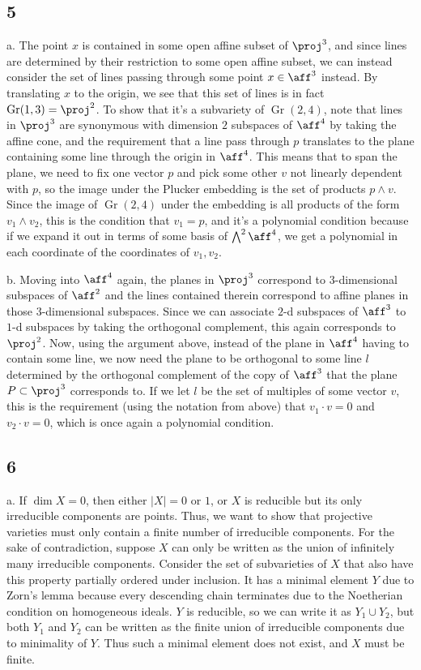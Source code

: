 \documentclass{article}
\DeclareMathOperator{\Gr}{Gr}
\begin{document}
\subsection*{5}
a. The point $x$ is contained in some open affine subset of $\proj^3$, and since lines are determined by their restriction to some open affine subset, we can instead consider the set of lines passing through some point $x\in\aff^3$ instead. By translating $x$ to the origin, we see that this set of lines is in fact $\Gr(1,3)=\proj^2$. To show that it's a subvariety of $\Gr(2,4)$, note that lines in $\proj^3$ are synonymous with dimension $2$ subspaces of $\aff^4$ by taking the affine cone, and the requirement that a line pass through $p$ translates to the plane containing some line through the origin in $\aff^4$. This means that to span the plane, we need to fix one vector $p$ and pick some other $v$ not linearly dependent with $p$, so the image under the Plucker embedding is the set of products $p\wedge v$. Since the image of $\Gr(2,4)$ under the embedding is all products of the form $v_1\wedge v_2$, this is the condition that $v_1=p$, and it's a polynomial condition because if we expand it out in terms of some basis of $\bigwedge^2 \aff^4$, we get a polynomial in each coordinate of the coordinates of $v_1,v_2$.

b. Moving into $\aff^4$ again, the planes in $\proj^3$ correspond to $3$-dimensional subspaces of $\aff^2$ and the lines contained therein correspond to affine planes in those $3$-dimensional subspaces. Since we can associate $2$-d subspaces of $\aff^3$ to $1$-d subspaces by taking the orthogonal complement, this again corresponds to $\proj^2$. Now, using the argument above, instead of the plane in $\aff^4$ having to contain some line, we now need the plane to be orthogonal to some line $l$ determined by the orthogonal complement of the copy of $\aff^3$ that the plane $P\subset\proj^3$ corresponds to. If we let $l$ be the set of multiples of some vector $v$, this is the requirement (using the notation from above) that $v_1\cdot v=0$ and $v_2\cdot v=0$, which is once again a polynomial condition.
\subsection*{6}
a. If $\dim X=0$, then either $|X|=0$ or $1$, or $X$ is reducible but its only irreducible components are points. Thus, we want to show that projective varieties must only contain a finite number of irreducible components. For the sake of contradiction, suppose $X$ can only be written as the union of infinitely many irreducible components. Consider the set of subvarieties of $X$ that also have this property partially ordered under inclusion. It has a minimal element $Y$ due to Zorn's lemma because every descending chain terminates due to the Noetherian condition on homogeneous ideals. $Y$ is reducible, so we can write it as $Y_1\cup Y_2$, but both $Y_1$ and $Y_2$ can be written as the finite union of irreducible components due to minimality of $Y$. Thus such a minimal element does not exist, and $X$ must be finite.
\end{document}
